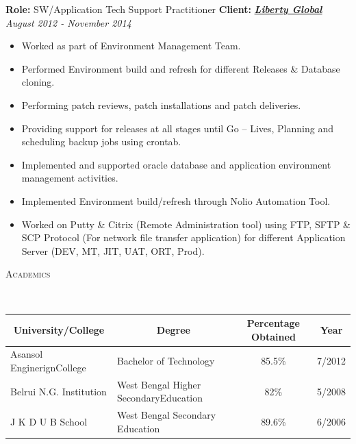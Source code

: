 \documentclass[9pt]{article}
\newenvironment{changemargin}[2]{%
  \begin{list}{}{%
    \setlength{\topsep}{0pt}%
    \setlength{\leftmargin}{#1}%
    \setlength{\rightmargin}{#2}%
    \setlength{\listparindent}{\parindent}%
    \setlength{\itemindent}{\parindent}%
    \setlength{\parsep}{\parskip}%
  }%
  \item[]}{\end{list}
}
\newcommand{\lineover}{
	\begin{changemargin}{-0.05in}{-0.05in}
		\vspace*{-8pt}
		\hrulefill \\
		\vspace*{-2pt}
	\end{changemargin}
}
\newcommand{\header}[1]{
	\begin{changemargin}{-0.5in}{-0.5in}
		\scshape{#1}\\
  	\lineover
	\end{changemargin}
}
\newenvironment{body} {
	\vspace*{-16pt}
	\begin{changemargin}{-0.25in}{-0.5in}
  }
	{\end{changemargin}
}
\begin{document}
\begin{body}
        \textbf{Role:} SW/Application Tech Support Practitioner \textbf{Client:} \textbf{\emph{\href{http://www.libertyglobal.com}{Liberty Global}}} \hfill \emph{August 2012 - November 2014}\\
	\vspace*{-4pt}
	\begin{itemize} \itemsep -0pt
          \item Worked as part of Environment Management Team.
          \item Performed Environment build and refresh for different Releases \& Database cloning.
          \item Performing patch reviews, patch installations and patch deliveries.
          \item Providing support for releases at all stages until Go – Lives, Planning and scheduling
backup jobs using crontab.
          \item Implemented and supported oracle database and application environment
management activities.
          \item Implemented Environment build/refresh through Nolio Automation Tool.
          \item Worked on Putty \& Citrix (Remote Administration tool) using FTP, SFTP \& SCP
Protocol (For network file transfer application) for different Application Server (DEV,
MT, JIT, UAT, ORT, Prod).
	\end{itemize}

\end{body}

\smallskip

\header{Academics}
\begin{body}
\smallskip
\begin{table}[h]
\centering
\begin{tabular}{|l|l|c|c|}
\hline
\multicolumn{1}{|c|}{\textbf{University/College}} & \multicolumn{1}{c|}{\textbf{Degree}}  & \textbf{Percentage Obtained} & \textbf{Year} \\ \hline
Asansol EnginerignCollege                         & Bachelor of Technology                & 85.5\%                       & 7/2012        \\ \hline
Belrui N.G. Institution                           & West Bengal Higher SecondaryEducation & 82\%                       & 5/2008        \\ \hline
J K D U B School                                  & West Bengal Secondary Education       & 89.6\%                       & 6/2006        \\ \hline
\end{tabular}
\end{table}

\end{body}
\end{document}
